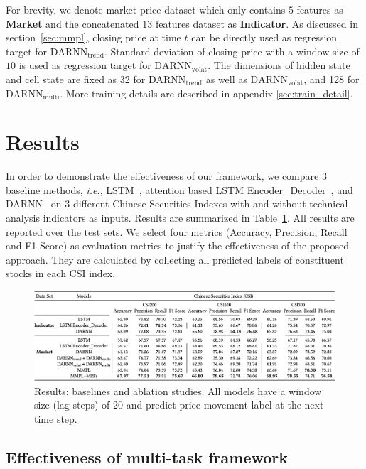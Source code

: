 For brevity, we denote market price dataset which only contains
$5$ features as \textbf{Market} and the concatenated $13$
features dataset as \textbf{Indicator}. As discussed in
section~\ref{sec:mmpl}, closing price at time $t$ can be directly
used as regression target for $\text{DARNN}_{\text{trend}}$.
Standard deviation of closing price with a window size of $10$ is
used as regression target for $\text{DARNN}_{\text{volat}}$. The
dimensions of hidden state and cell state are fixed as 32 for
$\text{DARNN}_{\text{trend}}$ as well as
$\text{DARNN}_{\text{volat}}$, and 128 for
$\text{DARNN}_{\text{multi}}$. More training details are
described in appendix \ref{sec:train_detail}.

\section{Results}
\label{sec:res}

In order to demonstrate the effectiveness of our framework, we
compare 3 baseline methods, \textit{i.e.},
LSTM~\cite{hochreiter1997long}, attention based LSTM
Encoder\_Decoder~\cite{attention}, and DARNN~\cite{qin2017dual}
on 3 different Chinese Securities Indexes with and without
technical analysis indicators as inputs. Results are summarized
in Table~\ref{tab:result}. All results are reported over the test
sets. We select four metrics (Accuracy, Precision, Recall and F1
Score) as evaluation metrics to justify the effectiveness of the
proposed approach. They are calculated by collecting all
predicted labels of constituent stocks in each CSI index.

\begin{figure}[t]
  \centering
  \includegraphics[width=1\columnwidth]{Part2/figures/table_results.png}
  \caption{\label{tab:result} Results: baselines and ablation
    studies. All models have a window size (lag steps) of 20 and
    predict price movement label at the next time step.}
\end{figure}


\subsection{Effectiveness of multi-task framework}

